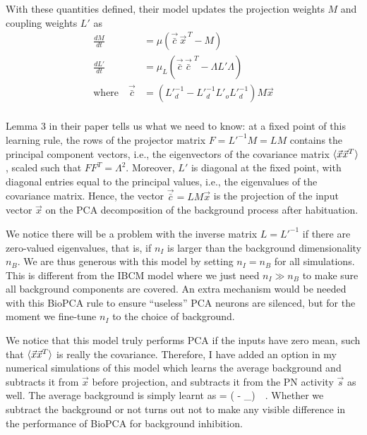 With these quantities defined, their model updates the projection weights $M$ and coupling weights $L'$ as
\begin{align}
\frac{dM}{dt} &= \mu \left(\vec{\bar{c}} \,\vec{x}^{\,T} - M \right)	\label{eq:biopca_m}	\\
\frac{dL'}{dt} &=  \mu_L \left( \vec{\bar{c}} \, \vec{\bar{c}}^{\,\, T} - \Lambda L' \Lambda \right)	\label{eq:biopca_w}	\\
\mathrm{where} \quad \vec{\bar{c}} &= \left({L'}_d^{-1} - {L'}_d^{-1} L'_o {L'}_d^{-1}\right) M \vec{x}	\label{eq:biopca_c}	\\
\end{align}

Lemma 3 in their paper tells us what we need to know: at a fixed point of this learning rule, the rows of the projector matrix $F = {L'}^{-1}M = LM$ contains the principal component vectors, i.e., the eigenvectors of the covariance matrix $\braket{ \vec{x} \vec{x}^T}$, scaled such that $F F^T = \Lambda^2$. Moreover, $L'$ is diagonal at the fixed point, with diagonal entries equal to the principal values, i.e., the eigenvalues of the covariance matrix. Hence, the vector $\vec{\bar{c}} = LM \vec{x}$ is the projection of the input vector $\vec{x}$ on the PCA decomposition of the background process after habituation. 

We notice there will be a problem with the inverse matrix $L = {L'}^{-1}$ if there are zero-valued eigenvalues, that is, if $n_I$ is larger than the background dimensionality $n_B$. We are thus generous with this model by setting $n_I = n_B$ for all simulations. This is different from the IBCM model where we just need $n_I \gg n_B$ to make sure all background components are covered. An extra mechanism would be needed with this BioPCA rule to ensure ``useless'' PCA neurons are silenced, but for the moment we fine-tune $n_I$ to the choice of background. 

We notice that this model truly performs PCA if the inputs have zero mean, such that $\braket{ \vec{x} \vec{x}^T}$ is really the covariance. Therefore, I have added an option in my numerical simulations of this model which learns the average background and subtracts it from $\vec{x}$ before projection, and subtracts it from the PN activity $\vec{s}$ as well. The average background is simply learnt as 
\beq
{} = \mu ( - _{}) \,\, . \label{eq:average_w_learning}
\eeq
Whether we subtract the background or not turns out not to make any visible difference in the performance of BioPCA for background inhibition. 

